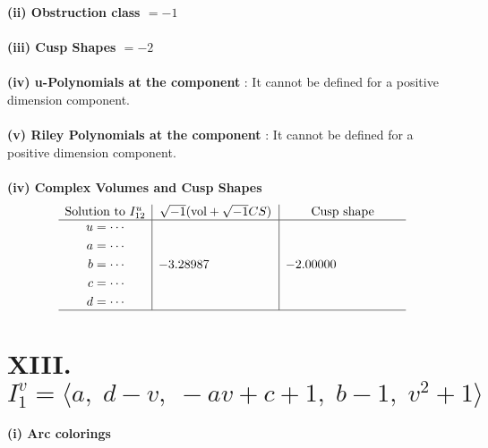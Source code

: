 \documentclass[1p]{elsarticle_modified}
\theoremstyle{definition}
\newcommand{\I}{\sqrt{-1}}
\begin{document}
\flushleft \textbf{(ii) Obstruction class $= -1$}\\~\\
\flushleft \textbf{(iii) Cusp Shapes $= -2$}\\~\\
\flushleft \textbf{(iv) u-Polynomials at the component} : It cannot be defined for a positive dimension component.\\~\\
\flushleft \textbf{(v) Riley Polynomials at the component} : It cannot be defined for a positive dimension component.\\~\\
\newpage\flushleft \textbf{(iv) Complex Volumes and Cusp Shapes}
$$\begin{array}{c|c|c} 
\text{Solution to }I^u_{12}& \I (\text{vol} + \sqrt{-1}CS) & \text{Cusp shape}\\
 \hline 
\begin{aligned}
u &= \cdots \\
a &= \cdots \\
b &= \cdots \\
c &= \cdots \\
d &= \cdots\end{aligned}
 & -3.28987\phantom{ +0.000000I} & -2.00000\phantom{ +0.000000I}\\
 \hline 
 \end{array}
$$\newpage\renewcommand{\arraystretch}{1}
\centering \section*{XIII. $I^v_{1}= \langle a,\;d- v,\;- a v+c+1,\;b-1,\;v^2+1 \rangle$}
\flushleft \textbf{(i) Arc colorings}\\
\end{document}
